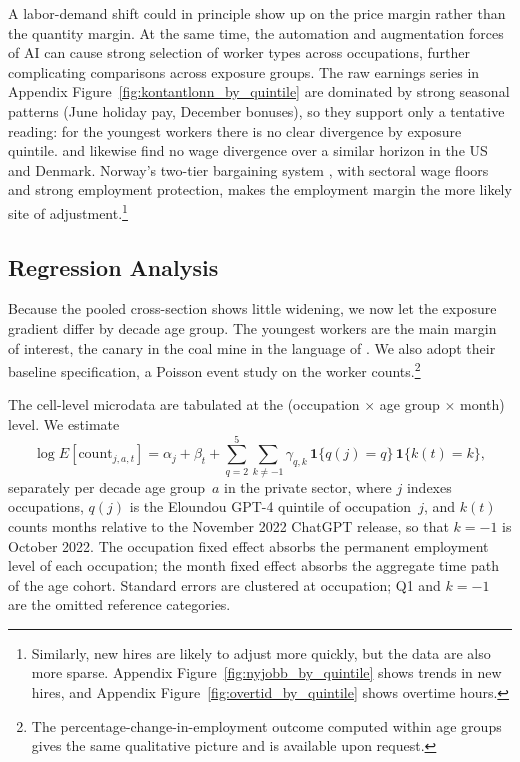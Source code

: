 \documentclass[12pt]{article}
\begin{document}
A labor-demand shift could in principle show up on the price margin rather than the quantity margin. At the same time, the automation and augmentation forces of AI can cause strong selection of worker types across occupations, further complicating comparisons across exposure groups. The raw earnings series in Appendix Figure~\ref{fig:kontantlonn_by_quintile} are dominated by strong seasonal patterns (June holiday pay, December bonuses), so they support only a tentative reading: for the youngest workers there is no clear divergence by exposure quintile. \citet{brynjolfsson2025} and \citet{humlum2026} likewise find no wage divergence over a similar horizon in the US and Denmark. Norway's two-tier bargaining system \citep{bhuller2022}, with sectoral wage floors and strong employment protection, makes the employment margin the more likely site of adjustment.\footnote{Similarly, new hires are likely to adjust more quickly, but the data are also more sparse. Appendix Figure~\ref{fig:nyjobb_by_quintile} shows trends in new hires, and Appendix Figure~\ref{fig:overtid_by_quintile} shows overtime hours.}

\subsection{Regression Analysis}\label{sec:regression}

Because the pooled cross-section shows little widening, we now let the exposure gradient differ by decade age group. The youngest workers are the main margin of interest, the canary in the coal mine in the language of \citet{brynjolfsson2025}. We also adopt their baseline specification, a Poisson event study on the worker counts.\footnote{The percentage-change-in-employment outcome computed within age groups gives the same qualitative picture and is available upon request.}

The cell-level microdata are tabulated at the (occupation $\times$ age group $\times$ month) level. We estimate
\[
\log E[\text{count}_{j,a,t}] = \alpha_{j} + \beta_{t} + \sum_{q=2}^{5}\sum_{k\neq -1}\gamma_{q,k}\,\mathbf{1}\{q(j)=q\}\,\mathbf{1}\{k(t)=k\},
\]
separately per decade age group~$a$ in the private sector, where $j$ indexes occupations, $q(j)$ is the Eloundou GPT-4 quintile of occupation~$j$, and $k(t)$ counts months relative to the November 2022 ChatGPT release, so that $k=-1$ is October 2022. The occupation fixed effect absorbs the permanent employment level of each occupation; the month fixed effect absorbs the aggregate time path of the age cohort. Standard errors are clustered at occupation; Q1 and $k=-1$ are the omitted reference categories.
\end{document}
